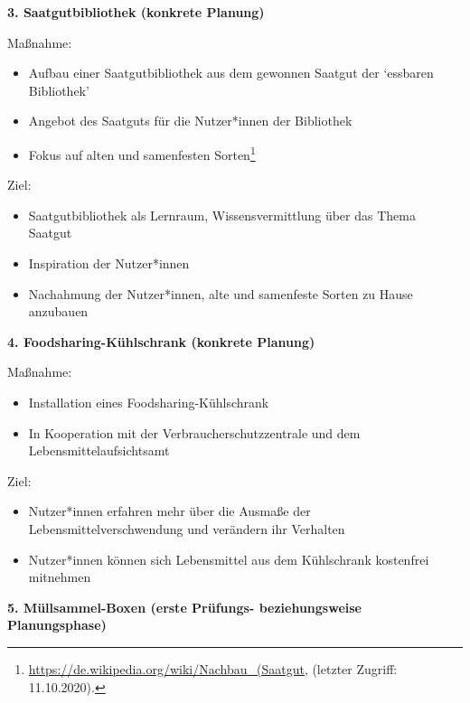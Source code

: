 \documentclass[a4paper,
fontsize=11pt,
oneside,
numbers=noperiodatend,
parskip=half-,
bibliography=totoc,
final
]{scrartcl}
\begin{document}
\textbf{3. Saatgutbibliothek (konkrete Planung)}

Maßnahme:

\begin{itemize}[itemsep=-5pt]

\item
  Aufbau einer Saatgutbibliothek aus dem gewonnen Saatgut der
  \enquote*{essbaren Bibliothek}
\item
  Angebot des Saatguts für die Nutzer*innen der Bibliothek
\item
  Fokus auf alten und samenfesten Sorten\footnote{\href{https://de.wikipedia.org/wiki/Nachbau_(Saatgut)}{https://de.wikipedia.org/wiki/Nachbau\_(Saatgut},
    (letzter Zugriff: 11.10.2020).}
\end{itemize}

Ziel:

\begin{itemize}[itemsep=-5pt]

\item
  Saatgutbibliothek als Lernraum, Wissensvermittlung über das Thema
  Saatgut
\item
  Inspiration der Nutzer*innen
\item
  Nachahmung der Nutzer*innen, alte und samenfeste Sorten zu Hause
  anzubauen
\end{itemize}

\textbf{4. Foodsharing-Kühlschrank (konkrete Planung)}

Maßnahme:

\begin{itemize}[itemsep=-5pt]

\item
  Installation eines Foodsharing-Kühlschrank
\item
  In Kooperation mit der Verbraucherschutzzentrale und dem
  Lebensmittelaufsichtsamt
\end{itemize}

Ziel:

\begin{itemize}[itemsep=-5pt]

\item
  Nutzer*innen erfahren mehr über die Ausmaße der
  Lebensmittelverschwendung und verändern ihr Verhalten
\item
  Nutzer*innen können sich Lebensmittel aus dem Kühlschrank kostenfrei
  mitnehmen
\end{itemize}

\textbf{5. Müllsammel-Boxen (erste Prüfungs- beziehungsweise
Planungsphase)}
\end{document}
